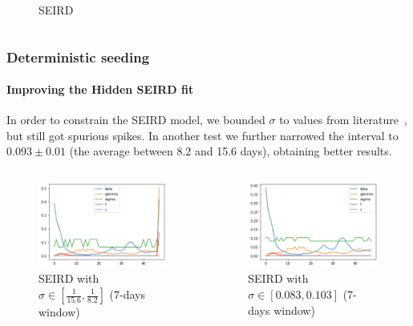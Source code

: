 \documentclass[aspectratio=43]{beamer}
\begin{document}
\begin{frame}
\begin{columns}
\begin{figure}
			\caption{SEIRD}
		\end{figure}
	\end{columns}
\end{frame}

\begin{frame}
	\frametitle{Deterministic seeding}
	\framesubtitle{Improving the Hidden SEIRD fit}
	
{\tiny 	In order to constrain the SEIRD model, we bounded $\sigma$ to values from literature~, but still got spurious spikes. In another test we further narrowed the interval to $0.093 \pm 0.01$ (the average between 8.2 and 15.6 days), obtaining better results.
	
	\begin{columns}
		\begin{figure}
			\includegraphics[width=\textwidth]{img/seird_det_2_7.png}
			\caption{SEIRD with $\sigma \in [\frac{1}{15.6}, \frac{1}{8.2}]$ (7-days window)}
		\end{figure}
		\begin{figure}
			\includegraphics[width=\textwidth]{img/seird_det_3_7.png}
			\caption{SEIRD with $\sigma \in [0.083, 0.103]$ (7-days window)}
		\end{figure}
	\end{columns}
}
\end{frame}
\end{document}
